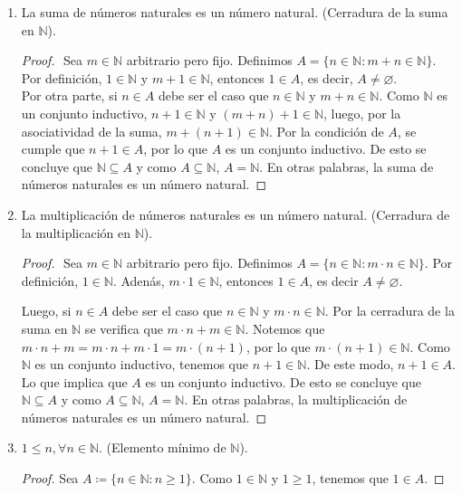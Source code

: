 \documentclass[11pt]{article}
\newcommand{\N}{\mathbb{N}}
\let\emptyset\varnothing
\begin{document}
\begin{enumerate}[label=\alph*)]
    \item La suma de números naturales es un número natural. (Cerradura de la suma en $\N$).
    \vspace{-1em}\begin{proof}$ $\newline
        Sea $m\in \N$ arbitrario pero fijo. Definimos $A=\{ n\in \N : m+n \in \N \}$. Por definición, $1\in \N$ y $m+1\in \N$, entonces $1\in A$, es decir, $A\neq \emptyset$. \\[5pt] Por otra parte, si $n\in A$ debe ser el caso que $n\in \N$ y $m+n\in \N$. Como $\N$ es un conjunto inductivo, $n+1 \in \N$ y $(m+n)+1 \in \N$, luego, por la asociatividad de la suma, $m+(n+1)\in \N$. Por la condición de $A$, se cumple que $n+1\in A$, por lo que $A$ es un conjunto inductivo. De esto se concluye que $\N\subseteq A$ y como $A\subseteq \N$, $A=\N$. En otras palabras, la suma de números naturales es un número natural.    
    \end{proof} \vspace{-1em}

    \item La multiplicación de números naturales es un número natural. (Cerradura de la multiplicación en $\N$).
    \vspace{-1em}\begin{proof}$ $\newline
        Sea $m\in \N$ arbitrario pero fijo. Definimos $A=\{n\in \N: m\cdot n \in \N\}$. Por definición, $1 \in \N$. Adenás, $m\cdot 1 \in \N$, entonces $1 \in A$, es decir $A \neq \emptyset$.
    
        Luego, si $n \in A$ debe ser el caso que $n\in \N$ y $m \cdot n \in \N$. Por la cerradura de la suma en $\N$ se verifica que $m\cdot n + m \in \N$. Notemos que $m\cdot n + m=m\cdot n + m\cdot 1 = m\cdot (n+1)$, por lo que $m \cdot (n+1) \in \N$. Como $\N$ es un conjunto inductivo, tenemos que $n+1\in \N$. De este modo, $n+1\in A$. Lo que implica que $A$ es un conjunto inductivo. De esto se concluye que $\N \subseteq A$ y como $A\subseteq \N$, $A=\N$. En otras palabras, la multiplicación de números naturales es un número natural.
    \end{proof} \vspace{-1em}

    \item $1\leq n, \forall n\in \N$. (Elemento mínimo de $\N$).
    \vspace{-1em}\begin{proof} 
        Sea $A\coloneqq \{n\in \N: n\geq 1\}$. Como $1\in \N$ y $1\geq 1$, tenemos que $1\in A$.


\end{proof}
\end{enumerate}
\end{document}
